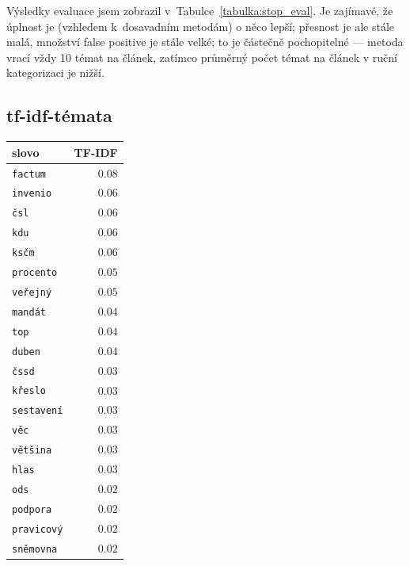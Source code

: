 \documentclass[12pt,a4paper]{report}
\begin{document}
Výsledky evaluace jsem zobrazil v~Tabulce~\ref{tabulka:stop_eval}. Je zajímavé, že úplnost je (vzhledem k~dosavadním metodám) o něco lepší; přesnost je ale stále malá, množství false positive je stále velké; to je částečně pochopitelné --- metoda vrací vždy 10 témat na článek, zatímco průměrný počet témat na článek v ruční kategorizaci je nižší.

\subsection{tf-idf-témata}



 {


    \begin{tabular}{ |l | r | }
        \hline
        \textbf{slovo} & \textbf{TF-IDF} \\ \hline
        
        \texttt{factum} & $0.08$ \\ \hline
        \texttt{invenio} & $0.06$ \\ \hline
        \texttt{čsl} & $0.06$ \\ \hline
        \texttt{kdu} & $0.06$ \\ \hline
        \texttt{ksčm} & $0.06$ \\ \hline
        \texttt{procento} & $0.05$ \\ \hline
        \texttt{veřejný} & $0.05$ \\ \hline
        \texttt{mandát} & $0.04$ \\ \hline
        \texttt{top} & $0.04$ \\ \hline
        \texttt{duben} & $0.04$ \\ \hline
        \hline
        
        \texttt{čssd} & $0.03$ \\ \hline
        \texttt{křeslo} & $0.03$ \\ \hline
        \texttt{sestavení} & $0.03$ \\ \hline
        \texttt{věc} & $0.03$ \\ \hline
        \texttt{většina} & $0.03$ \\ \hline
        \texttt{hlas} & $0.03$ \\ \hline
        \texttt{ods} & $0.02$ \\ \hline
        \texttt{podpora} & $0.02$ \\ \hline
        \texttt{pravicový} & $0.02$ \\ \hline
        \texttt{sněmovna} & $0.02$ \\ \hline
        

\end{tabular}}
\end{document}
